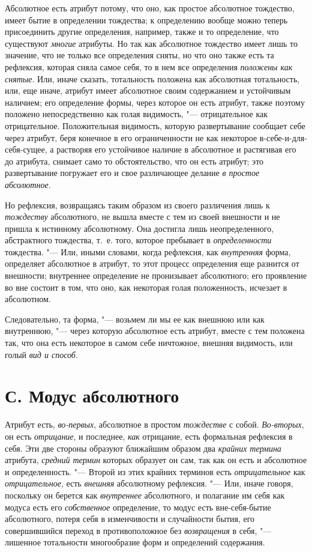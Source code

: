 Абсолютное есть атрибут потому, что оно, как простое абсолютное тождество,
имеет бытие в определении тождества; к определению вообще можно теперь
присоединить другие определения, например, также и то определение, что
существуют {\em многие} атрибуты. Но так как абсолютное
тождество имеет лишь то значение, что не только все определения сняты, но
что оно также есть та рефлексия, которая сняла самое себя, то в нем все
определения {\em положены как снятые}. Или, иначе
сказать, тотальность положена как абсолютная тотальность, или, еще иначе,
атрибут имеет абсолютное своим содержанием и устойчивым наличием; его
определение формы, через которое он есть атрибут, также поэтому положено
непосредственно как голая видимость, "--- отрицательное как отрицательное.
Положительная видимость, которую развертывание сообщает себе через атрибут,
беря конечное в его ограниченности не как некоторое
в-себе-и-для-себя-сущее, а растворяя его устойчивое наличие в абсолютное и
растягивая его до атрибута, снимает само то обстоятельство, что он есть
атрибут; это развертывание погружает его и свое различающее делание
{\em в простое абсолютное}.

Но рефлексия, возвращаясь таким образом из своего различения лишь к
{\em тождеству} абсолютного, не вышла вместе с тем из
своей внешности и не пришла к истинному абсолютному. Она достигла лишь
неопределенного, абстрактного тождества, т.~е. того, которое пребывает в
{\em определенности} тождества. "--- Или, иными словами,
когда рефлексия, как {\em внутренняя} форма, определяет
абсолютное в атрибут, то этот процесс определения еще разнится от
внешности; внутреннее определение не пронизывает абсолютного; его
проявление во вне состоит в том, что оно, как некоторая голая положенность,
исчезает в абсолютном.

Следовательно, та форма, "--- возьмем ли мы ее как внешнюю или как внутреннюю,
"--- через которую абсолютное есть атрибут, вместе с тем положена так, что она
есть некоторое в самом себе ничтожное, внешняя видимость, или голый
{\em вид и способ}.


\section[С. Модус абсолютного]{С. Модус абсолютного}

Атрибут есть, {\em во-первых}, абсолютное в простом {\em тождестве} с собой.
{\em Во-вторых}, он есть {\em отрицание}, и последнее,
{\em как} отрицание, есть формальная рефлексия в себя.
Эти две стороны образуют ближайшим образом два {\em крайних термина} атрибута,
{\em средний термин} которых образует он сам, так как
он есть и абсолютное и определенность. "--- Второй из этих крайних терминов
есть {\em отрицательное} как {\em отрицательное}, есть
{\em внешняя} абсолютному рефлексия. "--- Или, иначе
говоря, поскольку он берется как {\em внутреннее}
абсолютного, и полагание им себя как модуса есть его
{\em собственное} определение, то модус есть
вне-себя-бытие абсолютного, потеря себя в изменчивости и случайности бытия,
его совершившийся переход в противоположное без
{\em возвращения} в себя, "---лишенное тотальности
многообразие форм и определений содержания.

